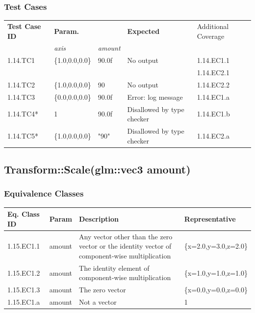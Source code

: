 \documentclass[11pt]{article}
\begin{document}
\subsubsection*{Test Cases}
\label{sec:org3018579}
\begin{center}
\begin{tabularx}{\textwidth}{lXXXX}
\hline
\textbf{Test Case ID} & \textbf{Param.} &  & \textbf{Expected} & Additional Coverage\\
 & \textit{axis} & \textit{amount} &  & \\
\hline
1.14.TC1 & \{1.0,0.0,0.0\} & 90.0f & No output & 1.14.EC1.1\\
 &  &  &  & 1.14.EC2.1\\
\hline
1.14.TC2 & \{1.0,0.0,0.0\} & 90 & No output & 1.14.EC2.2\\
\hline
1.14.TC3 & \{0.0,0.0,0.0\} & 90.0f & Error: log message & 1.14.EC1.a\\
\hline
1.14.TC4* & 1 & 90.0f & Disallowed by type checker & 1.14.EC1.b\\
\hline
1.14.TC5* & \{1.0,0.0,0.0\} & "90" & Disallowed by type checker & 1.14.EC2.a\\
\hline
\end{tabularx}
\end{center}
\subsection{Transform::Scale(glm::vec3 amount)}
\label{sec:org72e55ac}

\subsubsection*{Equivalence Classes}
\label{sec:org8aed2c0}
\begin{center}
\begin{tabularx}{\textwidth}{lXXX}
\hline
\textbf{Eq. Class ID} & \textbf{Param} & \textbf{Description} & \textbf{Representative}\\
\hline
1.15.EC1.1 & amount & Any vector other than the zero vector or the identity vector of component-wise multiplication & \{x=2.0,y=3.0,z=2.0\}\\
\hline
1.15.EC1.2 & amount & The identity element of component-wise multiplication & \{x=1.0,y=1.0,z=1.0\}\\
\hline
1.15.EC1.3 & amount & The zero vector & \{x=0.0,y=0.0,z=0.0\}\\
\hline
1.15.EC1.a & amount & Not a vector & 1\\
\hline
\end{tabularx}
\end{center}
\end{document}
